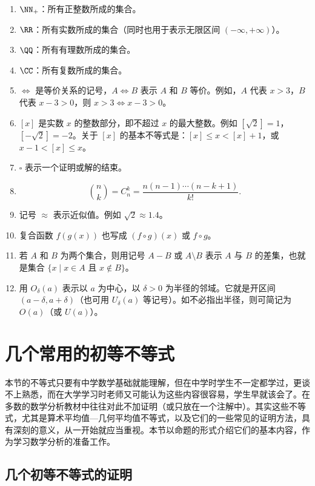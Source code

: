 \begin{enumerate}
  \item $\NN_+$：所有正整数所成的集合。
  \item $\RR$：所有实数所成的集合（同时也用于表示无限区间 $(-\infty,+\infty)$）。
  \item $\QQ$：所有有理数所成的集合。
  \item $\CC$：所有复数所成的集合。
  \item $\Longleftrightarrow$ 是等价关系的记号，$A\Longleftrightarrow B$ 表示 $A$ 和 $B$ 等价。例如，$A$ 代表 $x>3$，$B$ 代表 $x-3>0$，则 $x>3\Longleftrightarrow x-3>0$。
  \item $[x]$ 是实数 $x$ 的整数部分，即不超过 $x$ 的最大整数。例如 $[\sqrt2]=1$，$[-\sqrt2]=-2$。关于 $[x]$ 的基本不等式是：$[x]\le x<[x]+1$，或 $x-1<[x]\le x$。
  \item $\square$ 表示一个证明或解的结束。
  \item
  \[
    \binom{n}{k}=C_n^k=\frac{n(n-1)\cdots(n-k+1)}{k!}.
  \]
  \item 记号 $\approx$ 表示近似值。例如 $\sqrt2\approx1.4$。
  \item 复合函数 $f(g(x))$ 也写成 $(f\circ g)(x)$ 或 $f\circ g$。
  \item 若 $A$ 和 $B$ 为两个集合，则用记号 $A-B$ 或 $A\setminus B$ 表示 $A$ 与 $B$ 的差集，也就是集合 $\{x\mid x\in A\text{ 且 }x\notin B\}$。
  \item 用 $O_\delta(a)$ 表示以 $a$ 为中心，以 $\delta>0$ 为半径的邻域。它就是开区间 $(a-\delta,a+\delta)$（也可用 $U_\delta(a)$ 等记号）。如不必指出半径，则可简记为 $O(a)$（或 $U(a)$）。
\end{enumerate}

\section{几个常用的初等不等式}

本节的不等式只要有中学数学基础就能理解，但在中学时学生不一定都学过，更谈不上熟悉，而在大学学习时老师又可能认为这些内容很容易，学生早就该会了。在多数的数学分析教材中往往对此不加证明（或只放在一个注解中）。其实这些不等式，尤其是算术平均值—几何平均值不等式，以及它们的一些常见的证明方法，具有深刻的意义，从一开始就应当重视。本节以命题的形式介绍它们的基本内容，作为学习数学分析的准备工作。

\subsection{几个初等不等式的证明}

